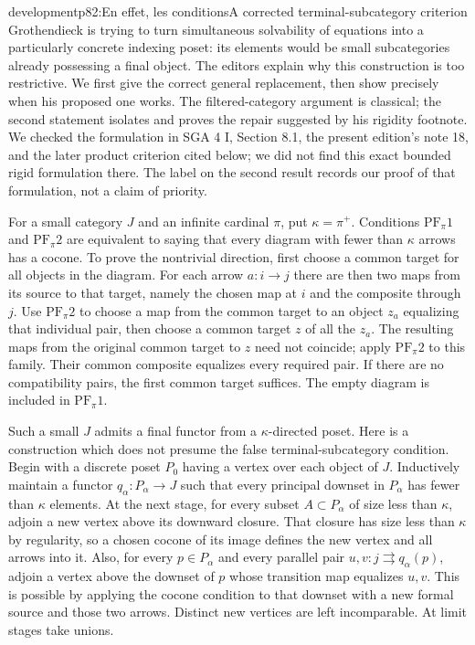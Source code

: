 \begin{dcomment}{development}{p82:En effet, les conditions}{A corrected terminal-subcategory criterion}
Grothendieck is trying to turn simultaneous solvability of equations into a particularly concrete indexing poset: its elements would be small subcategories already possessing a final object.  The editors explain why this construction is too restrictive.  We first give the correct general replacement, then show precisely when his proposed one works.  The filtered-category argument is classical; the second statement isolates and proves the repair suggested by his rigidity footnote.  We checked the formulation in SGA 4 I, Section 8.1, the present edition's note 18, and the later product criterion cited below; we did not find this exact bounded rigid formulation there.  The label on the second result records our proof of that formulation, not a claim of priority.

For a small category $J$ and an infinite cardinal $\pi$, put $\kappa=\pi^+$.  Conditions $\mathrm{PF}_\pi1$ and $\mathrm{PF}_\pi2$ are equivalent to saying that every diagram with fewer than $\kappa$ arrows has a cocone.  To prove the nontrivial direction, first choose a common target for all objects in the diagram.  For each arrow $a:i\to j$ there are then two maps from its source to that target, namely the chosen map at $i$ and the composite through $j$.  Use $\mathrm{PF}_\pi2$ to choose a map from the common target to an object $z_a$ equalizing that individual pair, then choose a common target $z$ of all the $z_a$.  The resulting maps from the original common target to $z$ need not coincide; apply $\mathrm{PF}_\pi2$ to this family.  Their common composite equalizes every required pair.  If there are no compatibility pairs, the first common target suffices.  The empty diagram is included in $\mathrm{PF}_\pi1$.

Such a small $J$ admits a final functor from a $\kappa$-directed poset.  Here is a construction which does not presume the false terminal-subcategory condition.  Begin with a discrete poset $P_0$ having a vertex over each object of $J$.  Inductively maintain a functor $q_\alpha:P_\alpha\to J$ such that every principal downset in $P_\alpha$ has fewer than $\kappa$ elements.  At the next stage, for every subset $A\subset P_\alpha$ of size less than $\kappa$, adjoin a new vertex above its downward closure.  That closure has size less than $\kappa$ by regularity, so a chosen cocone of its image defines the new vertex and all arrows into it.  Also, for every $p\in P_\alpha$ and every parallel pair $u,v:j\rightrightarrows q_\alpha(p)$, adjoin a vertex above the downset of $p$ whose transition map equalizes $u,v$.  This is possible by applying the cocone condition to that downset with a new formal source and those two arrows.  Distinct new vertices are left incomparable.  At limit stages take unions.


\end{dcomment}
